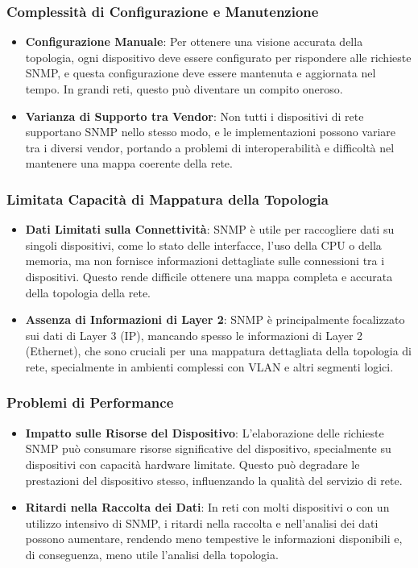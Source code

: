 \documentclass[target=bach,aauheader=,style=]{thud}
\begin{document}
\subsubsection{Complessità di Configurazione e Manutenzione}
    \begin{itemize}
      \item \textbf{Configurazione Manuale}: Per ottenere una visione accurata della topologia, ogni dispositivo deve essere configurato per rispondere alle richieste SNMP, e questa configurazione deve essere mantenuta e aggiornata nel tempo. In grandi reti, questo può diventare un compito oneroso.
      \item \textbf{Varianza di Supporto tra Vendor}: Non tutti i dispositivi di rete supportano SNMP nello stesso modo, e le implementazioni possono variare tra i diversi vendor, portando a problemi di interoperabilità e difficoltà nel mantenere una mappa coerente della rete.
    \end{itemize}

\subsubsection{Limitata Capacità di Mappatura della Topologia}
    \begin{itemize}
      \item \textbf{Dati Limitati sulla Connettività}: SNMP è utile per raccogliere dati su singoli dispositivi, come lo stato delle interfacce, l'uso della CPU o della memoria, ma non fornisce informazioni dettagliate sulle connessioni tra i dispositivi. Questo rende difficile ottenere una mappa completa e accurata della topologia della rete.
      \item \textbf{Assenza di Informazioni di Layer 2}: SNMP è principalmente focalizzato sui dati di Layer 3 (IP), mancando spesso le informazioni di Layer 2 (Ethernet), che sono cruciali per una mappatura dettagliata della topologia di rete, specialmente in ambienti complessi con VLAN e altri segmenti logici.
    \end{itemize}


\subsubsection{Problemi di Performance}
    \begin{itemize}
      \item \textbf{Impatto sulle Risorse del Dispositivo}: L'elaborazione delle richieste SNMP può consumare risorse significative del dispositivo, specialmente su dispositivi con capacità hardware limitate. Questo può degradare le prestazioni del dispositivo stesso, influenzando la qualità del servizio di rete.
      \item \textbf{Ritardi nella Raccolta dei Dati}: In reti con molti dispositivi o con un utilizzo intensivo di SNMP, i ritardi nella raccolta e nell'analisi dei dati possono aumentare, rendendo meno tempestive le informazioni disponibili e, di conseguenza, meno utile l'analisi della topologia.
    \end{itemize}
\end{document}
